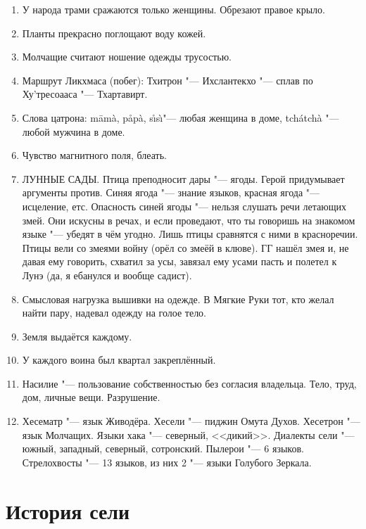 \documentclass[a4paper,10pt]{book}
\begin{document}
\begin{enumerate}
\item У народа трами сражаются только женщины. Обрезают правое крыло.
\item Планты прекрасно поглощают воду кожей.
\item Молчащие считают ношение одежды трусостью.
\item Маршрут Ликхмаса (побег): Тхитрон "--- Ихслантекхо "--- сплав по 
Ху'тресоааса "--- Тхартавирт.
\item 
Слова цатрона: m\=am\`a, p\r{a}p\`a, s\r{\i}s\`\i "--- любая женщина в доме, 
tch\'atch\`a "--- любой мужчина в доме.
\item Чувство магнитного поля, блеать.
\item ЛУННЫЕ САДЫ. Птица преподносит дары "--- ягоды. Герой придумывает 
аргументы против. Синяя ягода "--- знание языков, красная ягода "--- исцеление, 
етс. Опасность синей ягоды "--- нельзя слушать речи летающих змей. Они искусны 
в речах, и если проведают, что ты говоришь на знакомом языке "--- убедят в чём 
угодно. Лишь птицы сравнятся с ними в красноречии. Птицы вели со змеями войну 
(орёл со змеёй в клюве). ГГ нашёл змея и, не давая ему говорить, схватил за 
усы, завязал ему усами пасть и полетел к Лунэ (да, я ебанулся и вообще садист).
\item Смысловая нагрузка вышивки на одежде. В Мягкие Руки тот, кто желал найти 
пару, надевал одежду на голое тело.
\item Земля выдаётся каждому.
\item У каждого воина был квартал закреплённый.
\item Насилие "--- пользование собственностью без согласия владельца. Тело, 
труд, дом, личные вещи. Разрушение.
\item Хесематр "--- язык Живодёра.
Хесели "--- пиджин Омута Духов.
Хесетрон "--- язык Молчащих.
Языки хака "--- северный, <<дикий>>.
Диалекты сели "--- южный, западный, северный, сотронский.
Пылерои "--- 6 языков. Стрелохвосты "--- 13 языков, из них 2 "--- языки 
Голубого 
Зеркала.
\end{enumerate}

\section{История сели}
\end{document}
